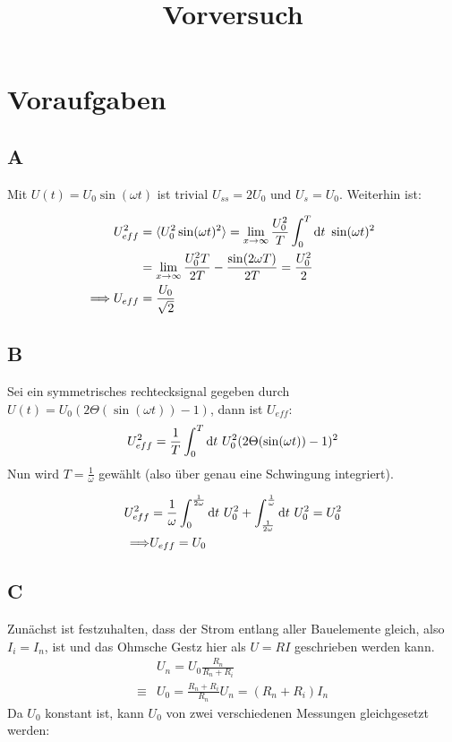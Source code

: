 

\title{Vorversuch}


\maketitle
\tableofcontents
\disclaimer

\chapter{Voraufgaben}
\section{A}
Mit $U(t) = U_0 \sin(\omega t)$ ist trivial $U_{ss} = 2 U_0$ und $U_s = U_0$.
Weiterhin ist:

\begin{align*}
	U_{eff}^2 &= \langle U_0^2 \sin(\omega t)^2 \rangle = \lim_{x\to\infty} \frac{U_0^2}{T} \int_0^T \text{d}t\text{ } \sin(\omega t)^2\\
	&= \lim_{x\to\infty} \frac{U_0^2 T}{2 T} - \frac{\sin(2 \omega T)}{2 T} = \frac{U_0^2}{2}\\
	\Longrightarrow U_{eff} &= \frac{U_0}{\sqrt{2}}
\end{align*}

\section{B}
Sei ein symmetrisches rechtecksignal gegeben durch $U(t) = U_0 (2 \Theta(\sin(\omega t)) - 1)$, dann ist $U_{eff}$:
\begin{align*}
	U_{eff}^2 = \frac{1}{T} \int_0^T \text{d}t\text{ } U_0^2 (2 \Theta(\sin(\omega t)) - 1)^2
\end{align*}
Nun wird $T = \frac{1}{\omega}$ gewählt (also über genau eine Schwingung integriert).

\begin{align*}
	U_{eff}^2 &=  \frac{1}{\omega}\int_0^{\frac{1}{2\omega}} \text{d}t\text{ } U_0^2 + \int_{\frac{1}{2\omega}}^{\frac{1}{\omega}} \text{d}t\text{ } U_0^2 = U_0^2 \\ \Longrightarrow& U_{eff} = U_0
\end{align*}


\section{C}
Zunächst ist festzuhalten, dass der Strom entlang aller Bauelemente gleich, also $I_i = I_n$, ist und das Ohmsche Gestz hier als $U = R I$ geschrieben werden kann.
\begin{align*}
	&U_n = U_0 \frac{R_n}{R_n + R_i}\\
	\equiv& U_0 = \frac{R_n + R_i}{R_n} U_n = (R_n + R_i) I_n
\end{align*}
Da $U_0$ konstant ist, kann $U_0$ von zwei verschiedenen Messungen gleichgesetzt werden:


